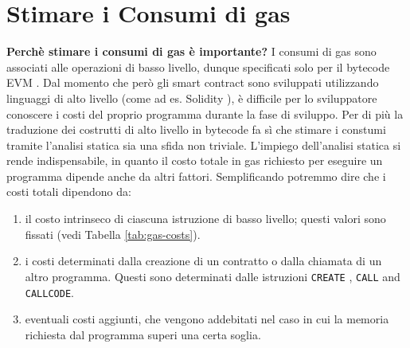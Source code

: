 \section{Stimare i Consumi di gas}


	\textbf{Perchè stimare i consumi di gas è importante?}\newline
    \newline
	\indent I consumi di gas sono associati alle operazioni di basso livello, 
	dunque specificati solo per il bytecode EVM \cite{wood2014ethereum}. Dal momento che però gli
	smart contract sono sviluppati utilizzando linguaggi di alto livello (come
	ad es. Solidity \cite{ethereum/solidity_2019}), è difficile per lo sviluppatore conoscere i 
	costi del proprio programma durante la fase di sviluppo. Per di più la traduzione 
	dei costrutti di alto livello in bytecode fa sì che stimare i constumi tramite l'analisi 
	statica sia una sfida non triviale. L'impiego dell'analisi statica si rende indispensabile, in quanto il costo totale in gas richiesto per eseguire un programma dipende anche da altri fattori.\newline
	\indent Semplificando potremmo dire che i costi totali dipendono da:
	\begin{enumerate}
	\item il costo intrinseco di ciascuna istruzione di basso livello; questi valori sono fissati (vedi Tabella \ref{tab:gas-costs}).
	\item i costi determinati dalla creazione di un contratto o dalla chiamata di un altro programma. Questi sono determinati dalle istruzioni \texttt{CREATE} , \texttt{CALL} and \texttt{CALLCODE}.
	\item eventuali costi aggiunti, che vengono addebitati nel caso in cui la memoria richiesta dal programma superi una certa soglia.
	\end{enumerate}

